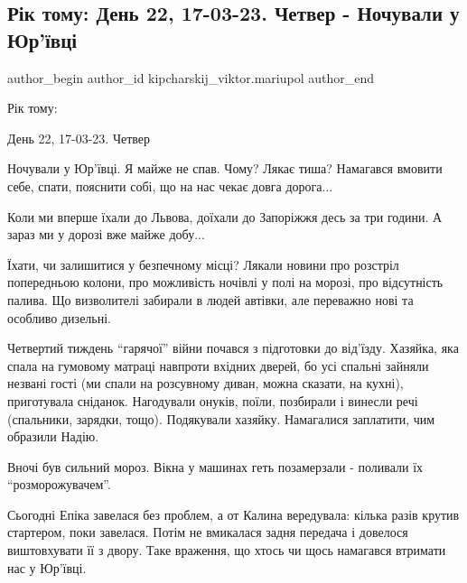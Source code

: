  
 
 
 
 

\subsection{Рік тому: День 22, 17-03-23. Четвер - Ночували у Юр'ївці}
\label{sec:17_03_2023.fb.kipcharskij_viktor.mariupol.1.r_k_tomu__den_22__17}

\ifcmt
 author_begin
   author_id kipcharskij_viktor.mariupol
 author_end
\fi

Рік тому:

День 22, 17-03-23. Четвер

Ночували у Юр'ївці. Я майже не спав. Чому? Лякає тиша? Намагався вмовити себе,
спати, пояснити собі, що на нас чекає довга дорога... 

Коли ми вперше їхали до Львова, доїхали до Запоріжжя десь за три години. А
зараз ми у дорозі вже майже добу...

Їхати, чи залишитися у безпечному місці? Лякали новини про розстріл
попередньою колони, про можливість ночівлі у полі на морозі, про відсутність
палива. Що визволителі забирали в людей автівки, але переважно нові та
особливо дизельні.

Четвертий тиждень \enquote{гарячої} війни почався з підготовки до від'їзду. Хазяйка,
яка спала на гумовому матраці навпроти вхідних дверей, бо усі спальні зайняли
незвані гості (ми спали на розсувному диван,  можна сказати, на кухні),
приготувала сніданок. Нагодували онуків, поїли, позбирали і винесли речі
(спальники, зарядки, тощо). Подякували хазяйку. Намагалися заплатити, чим
образили Надію.

Вночі був сильний мороз. Вікна у машинах геть позамерзали - поливали їх
\enquote{розморожувачем}.

Сьогодні Епіка завелася без проблем, а от Калина вередувала: кілька разів
крутив стартером, поки завелася. Потім не вмикалася задня передача і довелося
виштовхувати її з двору. Таке враження, що хтось чи щось намагався втримати нас
у Юр'ївці.

